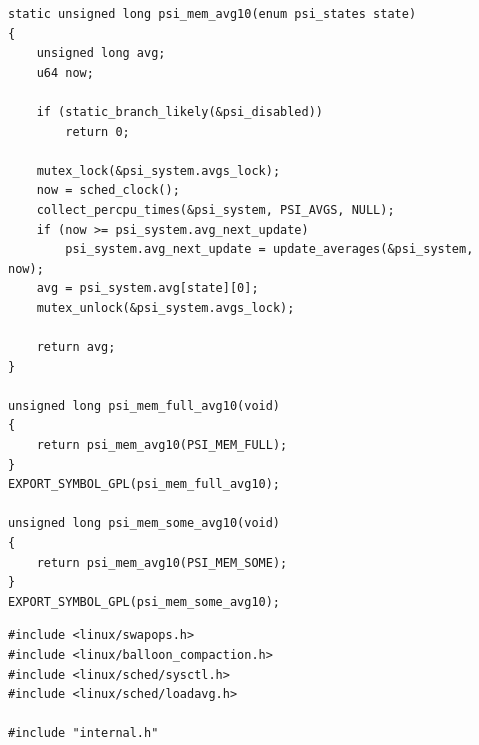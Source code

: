 \documentclass[12pt,a4paper]{article}
\begin{document}
\begin{codebox}
\begin{lstlisting}[style=cstyle]
static unsigned long psi_mem_avg10(enum psi_states state)
{
	unsigned long avg;
	u64 now;

	if (static_branch_likely(&psi_disabled))
		return 0;

	mutex_lock(&psi_system.avgs_lock);
	now = sched_clock();
	collect_percpu_times(&psi_system, PSI_AVGS, NULL);
	if (now >= psi_system.avg_next_update)
		psi_system.avg_next_update = update_averages(&psi_system, now);
	avg = psi_system.avg[state][0];
	mutex_unlock(&psi_system.avgs_lock);

	return avg;
}

unsigned long psi_mem_full_avg10(void)
{
	return psi_mem_avg10(PSI_MEM_FULL);
}
EXPORT_SYMBOL_GPL(psi_mem_full_avg10);

unsigned long psi_mem_some_avg10(void)
{
	return psi_mem_avg10(PSI_MEM_SOME);
}
EXPORT_SYMBOL_GPL(psi_mem_some_avg10);
\end{lstlisting}
\end{codebox}

\begin{codebox}
\begin{lstlisting}[style=cstyle]
#include <linux/swapops.h>
#include <linux/balloon_compaction.h>
#include <linux/sched/sysctl.h>
#include <linux/sched/loadavg.h>

#include "internal.h"
\end{lstlisting}
\end{codebox}
\end{document}
